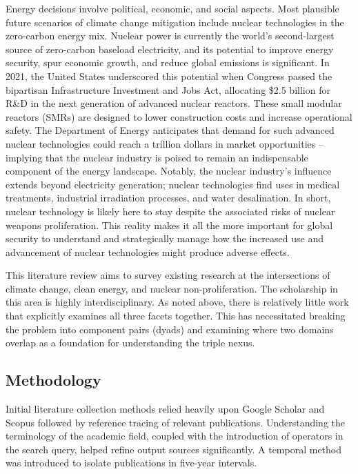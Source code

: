 \documentclass[11,5 pt]{article}
\begin{document}
Energy decisions involve political, economic, and social aspects. Most plausible future scenarios of climate change mitigation include nuclear technologies in the zero-carbon energy mix. Nuclear power is currently the world’s second-largest source of zero-carbon baseload electricity, and its potential to improve energy security, spur economic growth, and reduce global emissions is significant. In 2021, the United States underscored this potential when Congress passed the bipartisan Infrastructure Investment and Jobs Act, allocating \$2.5 billion for R\&D in the next generation of advanced nuclear reactors. These small modular reactors (SMRs) are designed to lower construction costs and increase operational safety. The Department of Energy anticipates that demand for such advanced nuclear technologies could reach a trillion dollars in market opportunities – implying that the nuclear industry is poised to remain an indispensable component of the energy landscape. Notably, the nuclear industry’s influence extends beyond electricity generation; nuclear technologies find uses in medical treatments, industrial irradiation processes, and water desalination. In short, nuclear technology is likely here to stay despite the associated risks of nuclear weapons proliferation. This reality makes it all the more important for global security to understand and strategically manage how the increased use and advancement of nuclear technologies might produce adverse effects.

This literature review aims to survey existing research at the intersections of climate change, clean energy, and nuclear non-proliferation. The scholarship in this area is highly interdisciplinary. As noted above, there is relatively little work that explicitly examines all three facets together. This has necessitated breaking the problem into component pairs (dyads) and examining where two domains overlap as a foundation for understanding the triple nexus.


\subsection{Methodology}


Initial literature collection methods relied heavily upon Google Scholar and Scopus followed by reference tracing of relevant publications. Understanding the terminology of the academic field, coupled with the introduction of operators in the search query, helped refine output sources significantly. A temporal method was introduced to isolate publications in five-year intervals.
\end{document}
